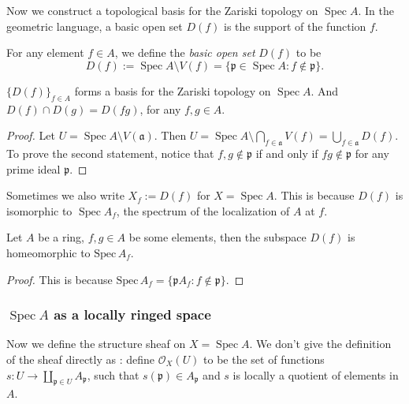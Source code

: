 \documentclass[11pt]{article}
\newcommand{\Spec}{\operatorname{Spec}}
\begin{document}
Now we construct a topological basis for the Zariski topology on $ \Spec A $. 
In the geometric language, 
a basic open set $ D(f) $ is the support of the function $ f $. 

\begin{definition}
    For any element $ f \in A $, we define the \emph{basic open set} $ D(f) $ to be
    $$ D(f) := \Spec A \setminus V(f) = \{\mathfrak{p} \in \Spec A : f \notin \mathfrak{p}\}. $$
\end{definition}

\begin{lemma}
    $ \{D(f)\}_{f \in A} $ forms a basis for the Zariski topology on $ \Spec A $. 
    And $ D(f) \cap D(g) = D(fg) $, for any $ f,g \in A $. 
\end{lemma}

\begin{proof}
    Let $ U = \Spec A \setminus V(\mathfrak{a}) $. 
    Then $ U= \Spec A \setminus \bigcap_{f \in \mathfrak{a}} V(f)=\bigcup_{f \in \mathfrak{a}}D(f)$. 
    To prove the second statement, notice that $ f,g \notin \mathfrak{p} $ 
    if and only if $ fg \notin \mathfrak{p} $ for 
    any prime ideal $ \mathfrak{p} $. 
\end{proof}

Sometimes we also write $ X_{f} :=D(f)$ for $ X=\Spec A $. 
This is because $ D(f) $ is isomorphic to 
$ \Spec A_{f} $, the spectrum of the localization of $ A $ at $ f $. 

\begin{corollary}
    \label{cor: homeomorphism on stalks}
    \cite[Exercise II.2.1]{hartsAG}
    Let $A$ be a ring, $f,g \in A$ be some elements, then the subspace $D(f)$ is homeomorphic 
    to $\mathrm{Spec}\,A_{f}$. 
\end{corollary}

\begin{proof}
    This is because $\mathrm{Spec}\,A_{f}=\{\mathfrak{p}A_{f}: f \notin \mathfrak{p} \}$. 
\end{proof}


\subsubsection{$ \Spec A $ as a locally ringed space}

Now we define the structure sheaf on $ X = \Spec A $. 
We don't give the definition of the sheaf directly 
as \cite{hartsAG}: 
define $ \mathscr{O}_{X}(U) $ to be the set of functions 
$ s: U \to \coprod_{\mathfrak{p} \in U} A_{\mathfrak{p}} $, 
such that $ s(\mathfrak{p}) \in A_{\mathfrak{p}} $ and 
$ s $ is locally a quotient of elements in $ A $. 
\end{document}
